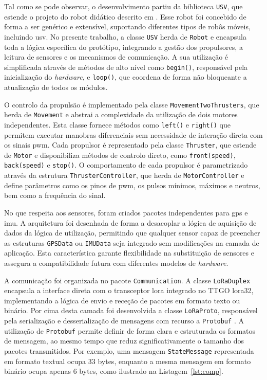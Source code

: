 Tal como se pode observar, o desenvolvimento partiu da biblioteca \texttt{USV}, que estende o projeto do robot didático descrito em \cite{didactic-robot-thesis}. Esse robot foi concebido de forma a ser genérico e extensível, suportando diferentes tipos de robôs móveis, incluindo \gls{usv}. No presente trabalho, a classe \texttt{USV} herda de \texttt{Robot} e encapsula toda a lógica específica do protótipo, integrando a gestão dos propulsores, a leitura de sensores e os mecanismos de comunicação. A sua utilização é simplificada através de métodos de alto nível como \texttt{begin()}, responsável pela inicialização do \emph{hardware}, e \texttt{loop()}, que coordena de forma não bloqueante a atualização de todos os módulos.  

O controlo da propulsão é implementado pela classe \texttt{MovementTwoThrusters}, que herda de \texttt{Movement} e abstrai a complexidade da utilização de dois motores independentes. Esta classe fornece métodos como \texttt{left()} e \texttt{right()} que permitem executar manobras diferenciais sem necessidade de interação direta com os sinais \gls{pwm}. Cada propulsor é representado pela classe \texttt{Thruster}, que estende de \texttt{Motor} e disponibiliza métodos de controlo direto, como \texttt{front(speed)}, \texttt{back(speed)} e \texttt{stop()}. O comportamento de cada propulsor é parametrizado através da estrutura \texttt{ThrusterController}, que herda de \texttt{MotorController} e define parâmetros como os pinos de \gls{pwm}, os pulsos mínimos, máximos e neutros, bem como a frequência do sinal.  

No que respeita aos sensores, foram criados pacotes independentes para \gls{gps} e \gls{imu}. A arquitetura foi desenhada de forma a desacoplar a lógica de aquisição de dados da lógica de utilização, permitindo que qualquer sensor capaz de preencher as estruturas \texttt{GPSData} ou \texttt{IMUData} seja integrado sem modificações na camada de aplicação. Esta característica garante flexibilidade na substituição de sensores e assegura a compatibilidade futura com diferentes modelos de \emph{hardware}.  

A comunicação foi organizada no pacote \texttt{Communication}. A classe \texttt{LoRaDuplex} encapsula a interface direta com o transceptor \gls{lora} integrado no TTGO \gls{lora}32, implementando a lógica de envio e receção de pacotes em formato texto ou binário. Por cima desta camada foi desenvolvida a classe \texttt{LoRaProto}, responsável pela serialização e desserialização de mensagens com recurso a \texttt{Protobuf} \cite{google-protobuf}. A utilização de \texttt{Protobuf} permite definir de forma clara e estruturada os formatos de mensagem, ao mesmo tempo que reduz significativamente o tamanho dos pacotes transmitidos. Por exemplo, uma mensagem \texttt{StateMessage} representada em formato textual ocupa 33 bytes, enquanto a mesma mensagem em formato binário ocupa apenas 6 bytes, como ilustrado na Listagem~\ref{lst:comp}.

